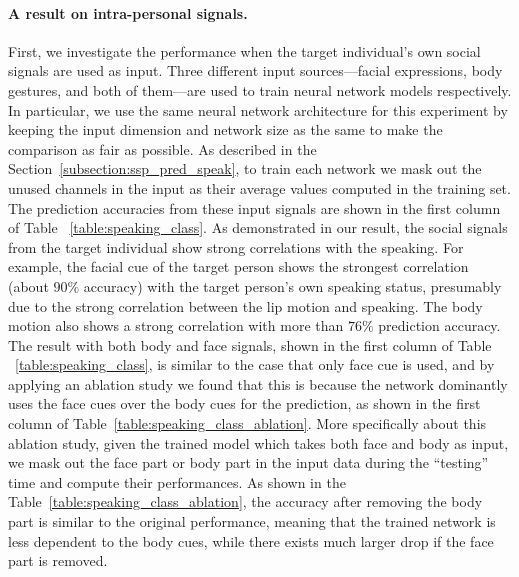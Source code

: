 \paragraph{A result on intra-personal signals.} First, we investigate the performance when the target individual's own social signals are used as input. Three different input sources---facial expressions, body gestures, and both of them---are used to train neural network models respectively. In particular, we use the same neural network architecture for this experiment by keeping the input dimension and network size as the same to make the comparison as fair as possible. As described in the Section~\ref{subsection:ssp_pred_speak}, to train each network we mask out the unused channels in the input as their average values computed in the training set. The prediction accuracies from these input signals are shown in the first column of Table ~\ref{table:speaking_class}. As demonstrated in our result, the social signals from the target individual show strong correlations with the speaking. For example, the facial cue of the target person shows the strongest correlation (about $90\%$ accuracy) with the target person's own speaking status, presumably due to the strong correlation between the lip motion and speaking. The body motion also shows a strong correlation with more than $76\%$ prediction accuracy. The result with both body and face signals, shown in the first column of Table ~\ref{table:speaking_class}, is similar to the case that only face cue is used, and by applying an ablation study we found that this is because the network dominantly uses the face cues over the body cues for the prediction, as shown in the first column of  Table~\ref{table:speaking_class_ablation}. More specifically about this ablation study, given the trained model which takes both face and body as input, we mask out the face part or body part in the input data during the ``testing'' time and compute their performances. As shown in the Table~\ref{table:speaking_class_ablation}, the accuracy after removing the body part is similar to the original performance, meaning that the trained network is less dependent to the body cues, while there exists much larger drop if the face part is removed. 


